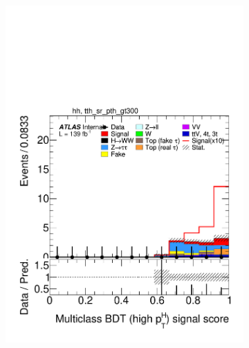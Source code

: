 \begin{figure}[h]
\begin{subfigure}[b]{0.32\textwidth}
    \includegraphics[width=\textwidth]{images/sr_cr_plots/plot_tth_signal_multiclass_gt200_hh_tth_sr_pth_gt300.pdf}
    \caption{}
  \end{subfigure}


\end{figure}
